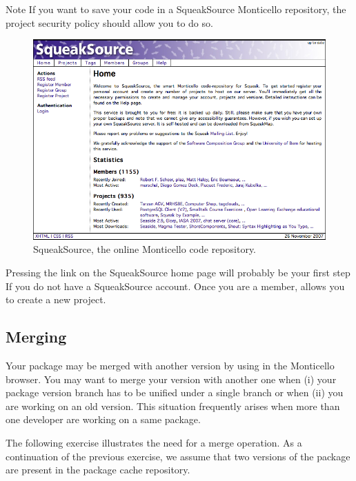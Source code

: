 \documentclass[a4paper,10pt,twoside]{book}
\begin{document}
Note If you want to save your code in a SqueakSource Monticello repository, the project security policy should allow you to do so.


\begin{figure}[ht]\centering
	\includegraphics[width=.75\linewidth]{squeaksource2}
	\caption{SqueakSource, the online Monticello code repository.}
\end{figure}

Pressing the  link on the SqueakSource home page will probably be your first step If you do not have a SqueakSource account. 
Once you are a member,  allows you to create a new project. 

\subsection{Merging}

Your package may be merged with another version by using  in the Monticello browser. You may want to merge your version with another one when (i) your package version branch has to be unified under a single branch or when (ii) you are working on an old version. This situation frequently arises when more than one developer are working on a same package. 

The following exercise illustrates the need for a merge operation. As a continuation of the previous exercise, we assume that two versions of the  package are present in the package cache repository.
\end{document}
